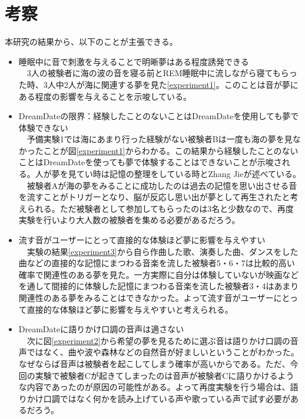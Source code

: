 \section{考察}
本研究の結果から、以下のことが主張できる。
\begin{itemize}

\item 睡眠中に音で刺激を与えることで明晰夢はある程度誘発できる\\
　3人の被験者に海の波の音を寝る前とREM睡眠中に流しながら寝てもらった時、3人中2人が海に関連する夢を見た\ref{experiment1}。このことは音が夢にある程度の影響を与えることを示唆している。\\

\item DreamDateの限界：経験したことのないことはDreamDateを使用しても夢で体験できない\\
　予備実験1では海にあまり行った経験がない被験者Bは一度も海の夢を見なかったことが図\ref{experiment1}からわかる。この結果から経験したことのないことはDreamDateを使っても夢で体験することはできないことが示唆される。人が夢を見てい時は記憶の整理をしている時とZhang Jieが述べている\cite{Zhang}。\\
　被験者Aが海の夢をみることに成功したのは過去の記憶を思い出させる音を流すことがトリガーとなり、脳が反応し思い出が夢として再生されたと考えられる。ただ被験者として参加してもらったのは3名と少数なので、再度実験を行いより大人数の被験者を集める必要があるだろう。\\

\item 流す音がユーザーにとって直接的な体験ほど夢に影響を与えやすい\\
　実験の結果\ref{experiment3}から自ら作曲した歌、演奏した曲、ダンスをした曲などの直接的な記憶にまつわる音楽を流した被験者5・6・7は比較的高い確率で関連性のある夢を見た。一方実際に自分は体験していないが映画などを通して間接的に体験した記憶にまつわる音楽を流した被験者3・4はあまり関連性のある夢をみることはできなかった。よって流す音がユーザーにとって直接的な体験ほど夢に影響を与えやすいと考えられる。\\

\item DreamDateに語りかけ口調の音声は適さない\\
　次に図\ref{experiment2}から希望の夢を見るために選ぶ音は語りかけ口調の音声ではなく、曲や波や森林などの自然音が好ましいということがわかった。なぜならば音声は被験者を起こしてしまう確率が高いからである。ただ、今回の実験で被験者Cが起きてしまったのは音声が被験者Cに語りかけるような内容であったのが原因の可能性がある。よって再度実験を行う場合は、語りかけ口調ではなく何かを読み上げている声や歌っている声で試す必要があるだろう。\\


\end{itemize}
